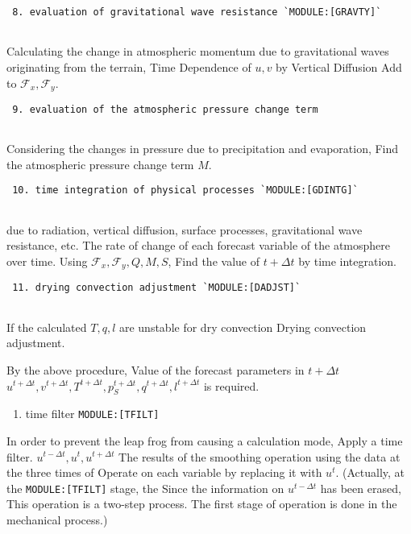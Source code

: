 \begin{verbatim}
 8. evaluation of gravitational wave resistance `MODULE:[GRAVTY]`
     
\end{verbatim}

Calculating the change in atmospheric momentum due to gravitational
waves originating from the terrain, Time Dependence of \(u, v\) by
Vertical Diffusion Add to \({\mathcal F}_x, {\mathcal F}_y\).

\begin{verbatim}
 9. evaluation of the atmospheric pressure change term
     
\end{verbatim}

Considering the changes in pressure due to precipitation and
evaporation, Find the atmospheric pressure change term \(M\).

\begin{verbatim}
 10. time integration of physical processes `MODULE:[GDINTG]`
     
\end{verbatim}

due to radiation, vertical diffusion, surface processes, gravitational
wave resistance, etc. The rate of change of each forecast variable of
the atmosphere over time. Using
\({\mathcal F}_x, {\mathcal F}_y, Q, M, S\), Find the value of
\(t+\Delta t\) by time integration.

\begin{verbatim}
 11. drying convection adjustment `MODULE:[DADJST]`
     
\end{verbatim}

If the calculated \(T, q, l\) are unstable for dry convection Drying
convection adjustment.

By the above procedure, Value of the forecast parameters in
\(t+\Delta t\)
\(u^{t+\Delta t}, v^{t+\Delta t}, T^{t+\Delta t}, p_S^{t+\Delta t}, q^{t+\Delta t}, l^{t+\Delta t}\)
is required.

\begin{enumerate}
\def\labelenumi{\arabic{enumi}.}
\setcounter{enumi}{5}
\tightlist
\item
  time filter \texttt{MODULE:{[}TFILT{]}}
\end{enumerate}

In order to prevent the leap frog from causing a calculation mode, Apply
a time filter. \(u^{t-\Delta t}, u^{t}, u^{t+\Delta t}\) The results of
the smoothing operation using the data at the three times of Operate on
each variable by replacing it with \(u^{t}\). (Actually, at the
\texttt{MODULE:{[}TFILT{]}} stage, the Since the information on
\(u^{t-\Delta t}\) has been erased, This operation is a two-step
process. The first stage of operation is done in the mechanical
process.)
